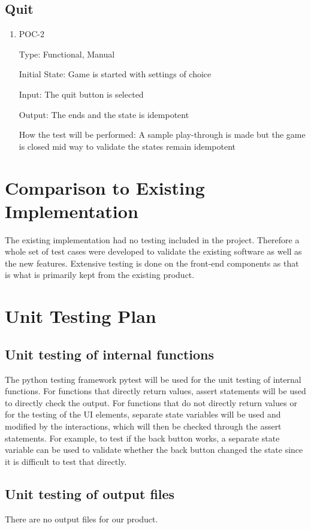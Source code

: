 \documentclass[12pt, titlepage]{article}
\begin{document}
\subsection{Quit}

\begin{enumerate}
	
	\item{POC-2\\}
	
Type: Functional, Manual

Initial State: Game is started with settings of choice

Input: The quit button is selected

Output: The ends and the state is idempotent

How the test will be performed: A sample play-through is made but the game is closed mid way to validate the states remain idempotent
	
\end{enumerate}

\section{Comparison to Existing Implementation}	

The existing implementation had no testing included in the project. Therefore a whole set of test cases were developed to validate the existing software as well as the new features. Extensive testing is done on the front-end components as that is what is primarily kept from the existing product. 
				
\section{Unit Testing Plan}
		
\subsection{Unit testing of internal functions}

The python testing framework pytest will be used for the unit testing of internal functions. For functions that directly return values, assert statements will be used to directly check the output. For functions that do not directly return values or for the testing of the UI elements, separate state variables will be used and modified by the interactions, which will then be checked through the assert statements. For example, to test if the back button works, a separate state variable can be used to validate whether the back button changed the state since it is difficult to test that directly.
		
\subsection{Unit testing of output files}	

There are no output files for our product. 	
\end{document}
